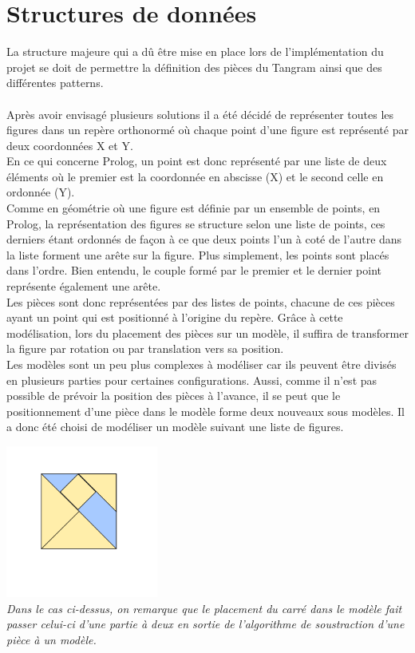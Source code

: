 \documentclass[a4paper, 11pt]{report}
\begin{document}
	    \section{Structures de données}

        La structure majeure qui a dû être mise en place lors de l'implémentation du projet se doit de permettre la définition des pièces du Tangram ainsi que des différentes patterns.\\ \ \\ 
        
        Après avoir envisagé plusieurs solutions il a été décidé de représenter toutes les figures dans un repère orthonormé où chaque point d'une figure est représenté par deux coordonnées X et Y. \\
        En ce qui concerne Prolog, un point est donc représenté par une liste de deux éléments où le premier est la coordonnée en abscisse (X) et le second celle en ordonnée (Y).\\
		Comme en géométrie où une figure est définie par un ensemble de points, en Prolog, la représentation des figures se structure selon une liste de points, ces derniers étant ordonnés de façon à ce que deux points l'un à coté de l'autre dans la liste forment une arête sur la figure. Plus simplement, les points sont placés dans l'ordre. Bien entendu, le couple formé par le premier et le dernier point représente également une arête.\\
		Les pièces sont donc représentées par des listes de points, chacune de ces pièces ayant un point qui est positionné à l'origine du repère. Grâce à cette modélisation, lors du placement des pièces sur un modèle, il suffira de transformer la figure par rotation ou par translation vers sa position.\\
		Les modèles sont un peu plus complexes à modéliser car ils peuvent être divisés en plusieurs parties pour certaines configurations. Aussi, comme il n'est pas possible de prévoir la position des pièces à l'avance, il se peut que le positionnement d'une pièce dans le modèle forme deux nouveaux sous modèles. Il a donc été choisi de modéliser un modèle suivant une liste de figures. 


        \begin{center}
            \includegraphics[width=5cm]{representation_sousfigure}\\
            \emph{Dans le cas ci-dessus, on remarque que le placement du carré dans le modèle fait passer celui-ci d'une partie à deux en sortie de l'algorithme de soustraction d'une pièce à un modèle.}
        \end{center}
        
\end{document}

